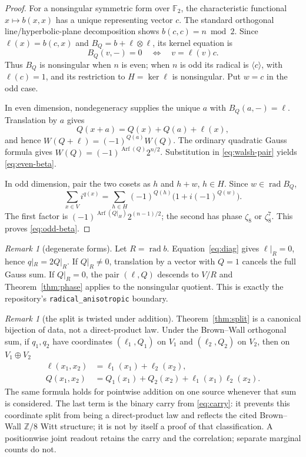 \documentclass[11pt]{article}
\theoremstyle{definition}
\theoremstyle{remark}
\newtheorem{remark}[theorem]{Remark}
\newcommand{\Z}{\mathbb Z}
\newcommand{\F}{\mathbb F}
\newcommand{\Arf}{\operatorname{Arf}}
\begin{document}
\begin{proof}
For a nonsingular symmetric form over $\F_2$, the characteristic functional
$x\mapsto b(x,x)$ has a unique representing vector $c$.  The standard
orthogonal line/hyperbolic-plane decomposition shows
$b(c,c)=n\bmod2$.  Since $\ell(x)=b(c,x)$ and
$B_Q=b+\ell\otimes\ell$, its kernel equation is
\[
 B_Q(v,-)=0
 \quad\Longleftrightarrow\quad
 v=\ell(v)c.
\]
Thus $B_Q$ is nonsingular when $n$ is even; when $n$ is odd its radical is
$\langle c\rangle$, with $\ell(c)=1$, and its restriction to
$H=\ker\ell$ is nonsingular.  Put $w=c$ in the odd case.

In even dimension, nondegeneracy supplies the unique $a$ with
$B_Q(a,-)=\ell$.  Translation by $a$ gives
\[
 Q(x+a)=Q(x)+Q(a)+\ell(x),
\]
and hence $W(Q+\ell)=(-1)^{Q(a)}W(Q)$.  The ordinary quadratic Gauss
formula gives $W(Q)=(-1)^{\Arf(Q)}2^{n/2}$.  Substitution in
\eqref{eq:walsh-pair} yields \eqref{eq:even-beta}.

In odd dimension, pair the two cosets as $h$ and $h+w$, $h\in H$.  Since
$w\in\operatorname{rad}B_Q$,
\[
 \sum_{x\in V}i^{q(x)}
 =\sum_{h\in H}(-1)^{Q(h)}
   \bigl(1+i(-1)^{Q(w)}\bigr).
\]
The first factor is
$(-1)^{\Arf(Q|_H)}2^{(n-1)/2}$; the second has phase $\zeta_8$ or
$\zeta_8^7$.  This proves \eqref{eq:odd-beta}.
\end{proof}

\begin{remark}[degenerate forms]
Let $R=\operatorname{rad}b$.  Equation~\eqref{eq:diag} gives
$\ell|_R=0$, hence $q|_R=2Q|_R$.  If $Q|_R\ne0$, translation by a vector
with $Q=1$ cancels the full Gauss sum.  If $Q|_R=0$, the pair $(\ell,Q)$
descends to $V/R$ and Theorem~\ref{thm:phase} applies to the nonsingular
quotient.  This is exactly the repository's
\texttt{radical\_anisotropic} boundary.
\end{remark}

\begin{remark}[the split is twisted under addition]
Theorem~\ref{thm:split} is a canonical bijection of data, not a direct-product
law.  Under the Brown--Wall orthogonal sum, if $q_1,q_2$ have coordinates
$(\ell_1,Q_1)$ on $V_1$ and $(\ell_2,Q_2)$ on $V_2$, then on
$V_1\oplus V_2$
\begin{equation}\label{eq:carry-law}
 \begin{aligned}
 \ell(x_1,x_2)&=\ell_1(x_1)+\ell_2(x_2),\\
 Q(x_1,x_2)&=Q_1(x_1)+Q_2(x_2)
   +\ell_1(x_1)\ell_2(x_2).
 \end{aligned}
\end{equation}
The same formula holds for pointwise addition on one source whenever that
sum is considered.  The last term is the binary carry from
\eqref{eq:carry}: it prevents this coordinate split from being a
direct-product law and reflects the cited Brown--Wall $\Z/8$ Witt structure;
it is not by itself a proof of that classification.  A positionwise joint
readout retains the carry and the correlation; separate marginal counts do
not.
\end{remark}
\end{document}
